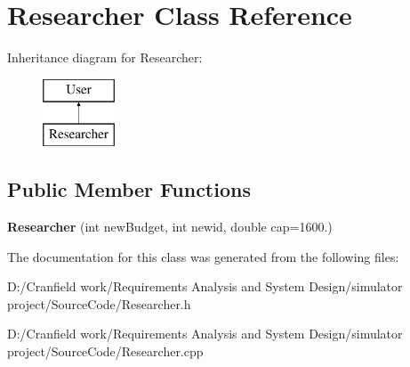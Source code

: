 \hypertarget{class_researcher}{}\section{Researcher Class Reference}
\label{class_researcher}
Inheritance diagram for Researcher\+:\begin{figure}[H]
\begin{center}
\leavevmode
\includegraphics[height=2.000000cm]{class_researcher}
\end{center}
\end{figure}
\subsection*{Public Member Functions}
\begin{DoxyCompactItemize}
\item 
\mbox{\label{class_researcher_a9c851cb4b8427bf22d4658df25ebcd02}} 
{\bfseries Researcher} (int new\+Budget, int newid, double cap=1600.)
\end{DoxyCompactItemize}


The documentation for this class was generated from the following files\+:\begin{DoxyCompactItemize}
\item 
D\+:/\+Cranfield work/\+Requirements Analysis and System Design/simulator project/\+Source\+Code/Researcher.\+h\item 
D\+:/\+Cranfield work/\+Requirements Analysis and System Design/simulator project/\+Source\+Code/Researcher.\+cpp\end{DoxyCompactItemize}

